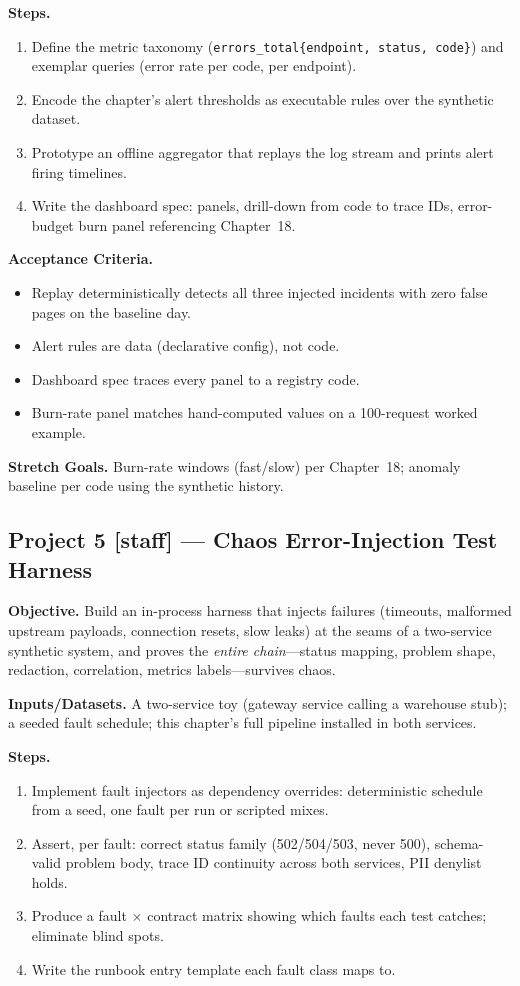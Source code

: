 \textbf{Steps.}
\begin{enumerate}
  \item Define the metric taxonomy (\texttt{errors\_total\{endpoint, status,
        code\}}) and exemplar queries (error rate per code, per endpoint).
  \item Encode the chapter's alert thresholds as executable rules over the
        synthetic dataset.
  \item Prototype an offline aggregator that replays the log stream and
        prints alert firing timelines.
  \item Write the dashboard spec: panels, drill-down from code to trace
        IDs, error-budget burn panel referencing Chapter~18.
\end{enumerate}

\textbf{Acceptance Criteria.}
\begin{itemize}
  \item[$\square$] Replay deterministically detects all three injected
        incidents with zero false pages on the baseline day.
  \item[$\square$] Alert rules are data (declarative config), not code.
  \item[$\square$] Dashboard spec traces every panel to a registry code.
  \item[$\square$] Burn-rate panel matches hand-computed values on a
        100-request worked example.
\end{itemize}

\textbf{Stretch Goals.} Burn-rate windows (fast/slow) per Chapter~18;
anomaly baseline per code using the synthetic history.

\subsection{Project 5 [staff] --- Chaos Error-Injection Test Harness}

\textbf{Objective.} Build an in-process harness that injects failures
(timeouts, malformed upstream payloads, connection resets, slow leaks) at
the seams of a two-service synthetic system, and proves the \emph{entire
chain}---status mapping, problem shape, redaction, correlation, metrics
labels---survives chaos.

\textbf{Inputs/Datasets.} A two-service toy (gateway service calling a
warehouse stub); a seeded fault schedule; this chapter's full pipeline
installed in both services.

\textbf{Steps.}
\begin{enumerate}
  \item Implement fault injectors as dependency overrides: deterministic
        schedule from a seed, one fault per run or scripted mixes.
  \item Assert, per fault: correct status family (502/504/503, never 500),
        schema-valid problem body, trace ID continuity across both
        services, PII denylist holds.
  \item Produce a fault $\times$ contract matrix showing which faults each
        test catches; eliminate blind spots.
  \item Write the runbook entry template each fault class maps to.
\end{enumerate}

